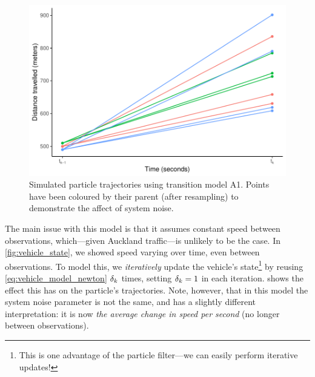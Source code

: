 \begin{knitrout}
\color{fgcolor}\begin{figure}

{\centering \includegraphics[width=.8\textwidth]{figure/transition_a1_demo-1} 

}

\caption[Simulated particle trajectories using transition model A1]{Simulated particle trajectories using transition model A1. Points have been coloured by their parent (after resampling) to demonstrate the affect of system noise.}\label{fig:transition_a1_demo}
\end{figure}


\end{knitrout}

The main issue with this model is that it assumes constant speed between observations, which---given Auckland traffic---is unlikely to be the case. In \cref{fig:vehicle_state}, we showed speed varying over time, even between observations. To model this, we \emph{iteratively} update the vehicle's state\footnote{This is one advantage of the particle filter---we can easily perform iterative updates!} by reusing \cref{eq:vehicle_model_newton} $\delta_k$ times, setting $\delta_k=1$ in each iteration.  shows the effect this has on the particle's trajectories. Note, however, that in this model the system noise parameter is not the same, and has a slightly different interpretation: it is now \emph{the average change in speed per second} (no longer between observations).

